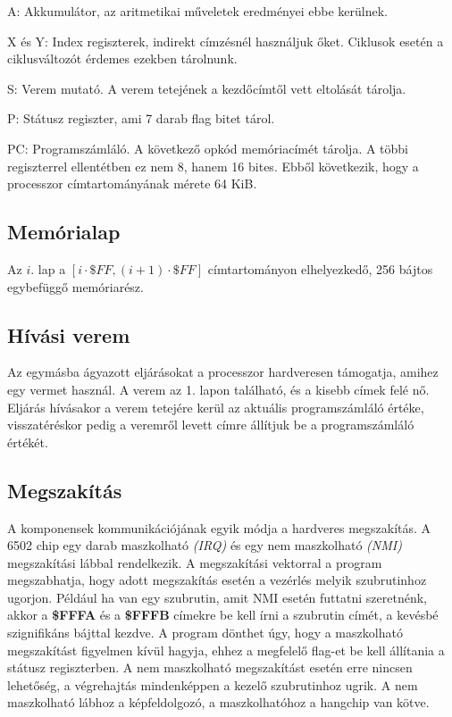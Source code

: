 \begin{compactdesc}
	\item[A:] Akkumulátor, az aritmetikai műveletek eredményei ebbe kerülnek.
	\item[X és Y:] 
	Index regiszterek, indirekt címzésnél használjuk őket.
	Ciklusok esetén a ciklusváltozót érdemes ezekben tárolnunk.
	\item[S:] 
	Verem mutató. A verem tetejének a kezdőcímtől vett eltolását tárolja.
	\item[P:]
	Státusz regiszter, ami 7 darab flag bitet tárol.
	\item[PC:]
	Programszámláló. A következő opkód memóriacímét tárolja.
	A többi regiszterrel ellentétben ez nem 8, hanem 16 bites.
	Ebből következik, hogy a processzor címtartományának mérete 64 KiB.
\end{compactdesc}


\subsection{Memórialap}
Az $i$. lap a $ [i \cdot \$FF, (i+1) \cdot \$FF] $ címtartományon elhelyezkedő, 256 bájtos egybefüggő memóriarész.

\subsection{Hívási verem}
Az egymásba ágyazott eljárásokat a processzor hardveresen támogatja, amihez egy vermet használ.
A verem az 1. lapon található, és a kisebb címek felé nő.
Eljárás hívásakor a verem tetejére kerül az aktuális programszámláló értéke, 
visszatéréskor pedig a veremről levett címre állítjuk be a programszámláló értékét.

\subsection{Megszakítás}
A komponensek kommunikációjának egyik módja a hardveres megszakítás.
A 6502 chip egy darab maszkolható \emph{(IRQ)} és egy nem maszkolható \emph{(NMI)} megszakítási lábbal rendelkezik.
A megszakítási vektorral a program megszabhatja, hogy adott megszakítás esetén a vezérlés melyik szubrutinhoz ugorjon. Például ha van egy szubrutin, amit NMI esetén futtatni szeretnénk, akkor a \textbf{\$FFFA} és a \textbf{\$FFFB} címekre be kell írni a szubrutin címét, a kevésbé szignifikáns bájttal kezdve.
A program dönthet úgy, hogy a maszkolható megszakítást figyelmen kívül hagyja, ehhez a megfelelő flag-et be kell állítania a státusz regiszterben. A nem maszkolható megszakítást esetén erre nincsen lehetőség, a végrehajtás mindenképpen a kezelő szubrutinhoz ugrik.
A nem maszkolható lábhoz a képfeldolgozó, a maszkolhatóhoz a hangchip van kötve.

